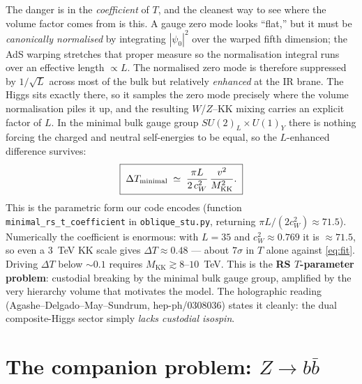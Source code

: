 \documentclass[11pt]{article}
\newcommand{\MKK}{M_{\mathrm{KK}}}
\newcommand{\cwsq}{c_W^2}
\newcommand{\vev}{v}
\newcommand{\SUL}{SU(2)_L}
\newcommand{\code}[1]{\texttt{#1}}
\theoremstyle{definition}
\begin{document}
The danger is in the \emph{coefficient} of $T$, and the cleanest way to see where
the volume factor comes from is this. A gauge zero mode looks ``flat,'' but it
must be \emph{canonically normalised} by integrating $|\psi_0|^2$ over the warped
fifth dimension; the AdS warping stretches that proper measure so the
normalisation integral runs over an effective length $\propto L$. The normalised
zero mode is therefore suppressed by $1/\sqrt L$ across most of the bulk but
relatively \emph{enhanced} at the IR brane. The Higgs sits exactly there, so it
samples the zero mode precisely where the volume normalisation piles it up, and
the resulting $W$/$Z$--KK mixing carries an explicit factor of $L$. In the
minimal bulk gauge group $\SUL\times U(1)_Y$ there is nothing forcing the charged
and neutral self-energies to be equal, so the $L$-enhanced difference survives:
\begin{equation}
\boxed{\;\Delta T_{\rm minimal} \;\simeq\; \frac{\pi L}{2\,\cwsq}\,
\frac{\vev^2}{\MKK^2}.\;}
\label{eq:Tmin}
\end{equation}
This is the parametric form our code encodes (function
\code{minimal\_rs\_t\_coefficient} in \code{oblique\_stu.py}, returning
$\pi L/(2\cwsq)\approx 71.5$). Numerically the coefficient is enormous: with
$L=35$ and $\cwsq\approx0.769$ it is $\approx 71.5$, so even a $3$~TeV KK scale
gives $\Delta T\approx 0.48$ --- about $7\sigma$ in $T$ alone against
\eqref{eq:fit}. Driving $\Delta T$ below $\sim 0.1$ requires $\MKK\gtrsim
8$--$10$~TeV. This is the \textbf{RS $T$-parameter problem}: custodial breaking by
the minimal bulk gauge group, amplified by the very hierarchy volume that
motivates the model. The holographic reading (Agashe--Delgado--May--Sundrum,
hep-ph/0308036) states it cleanly: the dual composite-Higgs sector simply
\emph{lacks custodial isospin}.

\section{The companion problem: $Z\to b\bar b$}
\label{sec:Zbb}
\end{document}
